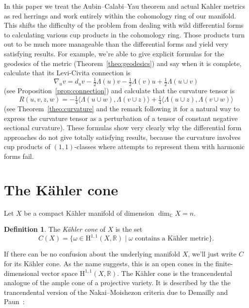 \documentclass[11pt,a4paper]{amsart}
\theoremstyle{definition}
\newtheorem*{defi}{Definition}
\theoremstyle{remark}
\newcommand{\RR}{\mathbb{R}}
\newcommand{\CC}{\mathbb{C}}
\def\half{\tfrac12}
\def\onfo{\tfrac14}
\def\coho#1{\mathrm{H}^{#1}}
\def\conn{\nabla}
\def\kf{\omega}
\def\Lef{\Lambda}
\def\ton{u}
\def\ttw{v}
\def\tth{z}
\def\tfo{w}
\def\KC{C}
\begin{document}
In this paper we treat the Aubin--Calabi--Yau theorem and actual Kahler
metrics as red herrings and work entirely within the cohomology ring of
our manifold. This shifts the difficulty of the problem from dealing
with wild differential forms to calculating various cup products in the
cohomology ring. Those products turn out to be much more manageable than
the differential forms and yield very satisfying results. For example,
we're able to give explicit formulas for the geodesics of the metric
(Theorem~\ref{theo:geodesics}) and say when it is complete, calculate
that its
Levi-Civita connection is
$$
\conn_{\ton} \ttw
= d_{\ton} \ttw 
- \half \Lef(\ton) \ttw 
- \half \Lef(\ttw) \ton
+ \half \Lef(\ton \cup \ttw)
$$
(see Proposition~\ref{prop:connection}) and calculate that the curvature
tensor is
$$
R(\ton,\ttw,\tth,\tfo)
=
- \onfo \langle \Lef(\ton \cup \tfo), \Lef(\ttw \cup \tth) \rangle
+ \onfo \langle \Lef(\ton \cup \tth), \Lef(\ttw \cup \tfo) \rangle
$$
(see Theorem~\ref{theo:curvature} and the remark following it for a
natural way to express the curvature tensor as a perturbation of a
tensor of constant negative sectional curvature).  These formulas show
very clearly why the differential form approaches do not give totally
satisfying results, because the curvature involves cup products of
$(1,1)$-classes where attempts to represent them with harmonic forms
fail.


\section{The K\"{a}hler cone}

Let $X$ be a compact K\"{a}hler manifold of dimension $\dim_{\CC} X = n$.

\begin{defi}
The \emph{K\"{a}hler cone} of $X$ is the set
\begin{equation*}
C(X) = \{ \kf \in \coho{1,1}(X,\RR) 
\mid
\text{$\kf$ contains a K\"{a}hler metric}
\}.
\end{equation*}
\end{defi}

If there can be no confusion about the underlying manifold $X$, we'll
just write $\KC$ for its K\"{a}hler cone.  As the name suggests, this is
an open cones in the finite-dimensional vector space
$\coho{1,1}(X,\RR)$. The K\"{a}hler cone is the trancendental analogue
of the ample cone of a projective variety. It is described by the the
trancendental version of the Nakai--Moishezon criteria due to Demailly
and Paun~\cite{DemaillyPaun}:
\end{document}
